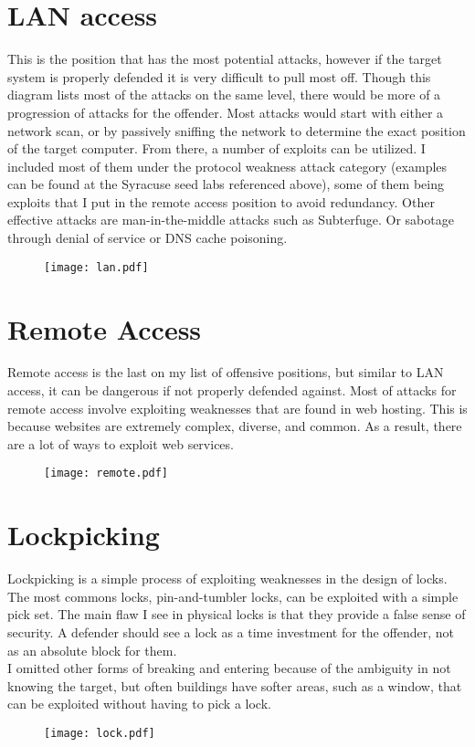\documentclass{article}
\begin{document}
\section{LAN access}
This is the position that has the most potential attacks, however if the target system is properly defended it is very difficult to pull most off. Though this diagram lists most of the attacks on the same level, there would be more of a progression of attacks for the offender. Most attacks would start with either a network scan, or by passively sniffing the network to determine the exact position of the target computer. From there, a number of exploits can be utilized. I included most of them under the protocol weakness attack category (examples can be found at the Syracuse seed labs referenced above), some of them being exploits that I put in the remote access position to avoid redundancy. Other effective attacks are man-in-the-middle attacks such as Subterfuge. Or sabotage through denial of service or DNS cache poisoning.\\
\begin{figure}[ht]
\centering
\texttt{[image: lan.pdf]}
\end{figure}
\pagebreak

\section{Remote Access}
Remote access is the last on my list of offensive positions, but similar to LAN access, it can be dangerous if not properly defended against. Most of attacks for remote access involve exploiting weaknesses that are found in web hosting. This is because websites are extremely complex, diverse, and common. As a result, there are a lot of ways to exploit web services.\\
\begin{figure}[ht]
\centering
\texttt{[image: remote.pdf]}
\end{figure}
\pagebreak

\section{Lockpicking}
Lockpicking is a simple process of exploiting weaknesses in the design of locks. The most commons locks, pin-and-tumbler locks, can be exploited with a simple pick set. The main flaw I see in physical locks is that they provide a false sense of security. A defender should see a lock as a time investment for the offender, not as an absolute block for them.\\
I omitted other forms of breaking and entering because of the ambiguity in not knowing the target, but often buildings have softer areas, such as a window, that can be exploited without having to pick a lock.\\
\begin{figure}[ht]
\centering
\texttt{[image: lock.pdf]}
\end{figure}
\pagebreak
\end{document}
